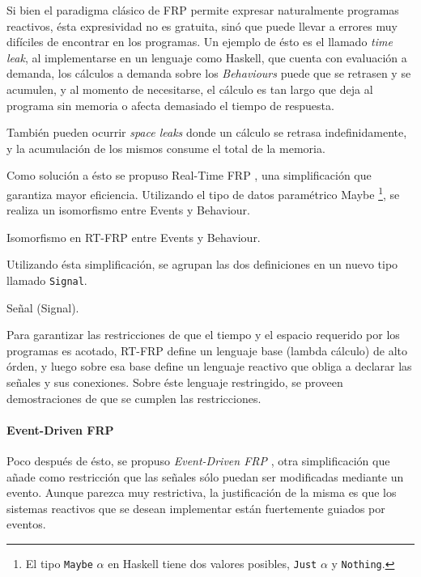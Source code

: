 
  Si bien el paradigma clásico de FRP permite expresar naturalmente
programas reactivos, ésta expresividad no es gratuita, sinó que
puede llevar a errores muy difíciles de encontrar en los programas.
  Un ejemplo de ésto es el llamado \emph{time leak}, al implementarse
en un lenguaje como Haskell, que cuenta con evaluación a demanda,
los cálculos a demanda sobre los \emph{Behaviours} puede que se
retrasen y se acumulen, y al momento de necesitarse, el cálculo
es tan largo que deja al programa sin memoria o afecta demasiado
el tiempo de respuesta.

  También pueden ocurrir \emph{space leaks} donde un cálculo se
retrasa indefinidamente, y la acumulación de los mismos consume
el total de la memoria.

  Como solución a ésto se propuso
Real-Time FRP \cite{wan2001:rtfrp}, una simplificación que
garantiza mayor eficiencia.
  Utilizando el tipo de datos paramétrico Maybe
  \footnote{
    El tipo \texttt{Maybe} $\alpha$ en Haskell tiene dos
    valores posibles,
    \texttt{Just} $\alpha$ y \texttt{Nothing}.
  },
  se realiza un isomorfismo entre Events y Behaviour.

\begin{definicion}
  Isomorfismo en RT-FRP entre Events y Behaviour.
\end{definicion}

  Utilizando ésta simplificación, se agrupan las dos definiciones en un
  nuevo tipo llamado \texttt{Signal}.

\begin{definicion}
  Señal (Signal).
\end{definicion}

  Para garantizar las restricciones de que el tiempo y el espacio requerido
por los programas es acotado, RT-FRP define un lenguaje base (lambda cálculo)
de alto órden, y luego sobre esa base define un lenguaje reactivo que obliga
a declarar las señales y sus conexiones.
  Sobre éste lenguaje restringido, se proveen demostraciones de que
se cumplen las restricciones.\\

\paragraph{Event-Driven FRP}
  Poco después de ésto, se propuso \textit{Event-Driven FRP}
\cite{wan2002:edfrp}, otra simplificación que añade como restricción
que las señales sólo puedan ser modificadas mediante un evento.
  Aunque parezca muy restrictiva, la justificación de la misma es que
los sistemas reactivos que se desean implementar están fuertemente
guiados por eventos.

